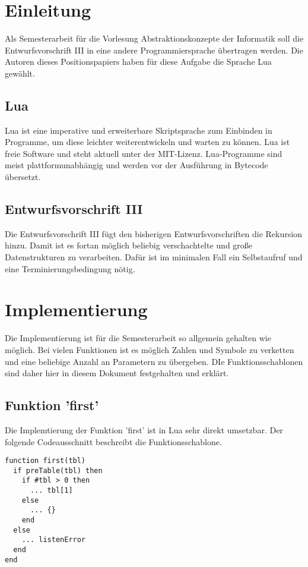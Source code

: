 \chapter{Einleitung}

Als Semesterarbeit für die Vorlesung Abstraktionskonzepte der Informatik soll die Entwurfsvorschrift III in eine andere Programmiersprache übertragen werden. Die Autoren dieses Positionspapiers haben für diese Aufgabe die Sprache Lua gewählt.

\section{Lua}
Lua ist eine imperative und erweiterbare Skriptsprache zum Einbinden in Programme, um diese leichter weiterentwickeln und warten zu können. Lua ist freie Software und steht aktuell unter der MIT-Lizenz. Lua-Programme sind meist plattformunabhängig und werden vor der Ausführung in Bytecode übersetzt. 


\section{Entwurfsvorschrift III}
Die Entwurfsvorschrift III fügt den bisherigen Entwurfsvorschriften die Rekursion hinzu. Damit ist es fortan möglich beliebig verschachtelte und große Datenstrukturen zu verarbeiten. Dafür ist im minimalen Fall ein Selbstaufruf und eine Terminierungsbedingung nötig.

\chapter{Implementierung}
Die Implementierung ist für die Semesterarbeit so allgemein gehalten wie möglich. Bei vielen Funktionen ist es möglich Zahlen und Symbole zu verketten und eine beliebige Anzahl an Parametern zu übergeben. DIe Funktionsschablonen sind daher hier in diesem Dokument festgehalten und erklärt.

\section{Funktion 'first'}
Die Implemtierung der Funktion 'first' ist in Lua sehr direkt umsetzbar. Der folgende Codeausschnitt beschreibt die Funktionsschablone.
\begin{lstlisting}
function first(tbl)
  if preTable(tbl) then
    if #tbl > 0 then
      ... tbl[1]
    else
      ... {}
    end
  else
    ... listenError
  end
end
\end{lstlisting}

